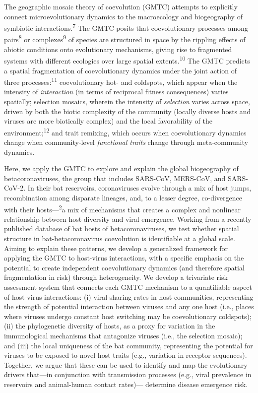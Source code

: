 \documentclass[11pt]{article}
\begin{document}
The geographic mosaic theory of coevolution (GMTC) attempts to
explicitly connect microevolutionary dynamics to the macroecology and
biogeography of symbiotic interactions.\textsuperscript{7} The GMTC
posits that coevolutionary processes among pairs\textsuperscript{8} or
complexes\textsuperscript{9} of species are structured in space by the
rippling effects of abiotic conditions onto evolutionary mechanisms,
giving rise to fragmented systems with different ecologies over large
spatial extents.\textsuperscript{10} The GMTC predicts a spatial
fragmentation of coevolutionary dynamics under the joint action of three
processes:\textsuperscript{11} coevolutionary hot- and coldspots, which
appear when the intensity of \emph{interaction} (in terms of reciprocal
fitness consequences) varies spatially; selection mosaics, wherein the
intensity of \emph{selection} varies across space, driven by both the
biotic complexity of the community (locally diverse hosts and viruses
are more biotically complex) and the local favorability of the
environment;\textsuperscript{12} and trait remixing, which occurs when
coevolutionary dynamics change when community-level \emph{functional
traits} change through meta-community dynamics.

Here, we apply the GMTC to explore and explain the global biogeography
of betacoronaviruses, the group that includes SARS-CoV, MERS-CoV, and
SARS-CoV-2. In their bat reservoirs, coronaviruses evolve through a mix
of host jumps, recombination among disparate lineages, and, to a lesser
degree, co-divergence with their hosts---\textsuperscript{2}a mix of
mechanisms that creates a complex and nonlinear relationship between
host diversity and viral emergence. Working from a recently published
database of bat hosts of betacoronaviruses, we test whether spatial
structure in bat-betacoronavirus coevolution is identifiable at a global
scale. Aiming to explain these patterns, we develop a generalized
framework for applying the GMTC to host-virus interactions, with a
specific emphasis on the potential to create independent coevolutionary
dynamics (and therefore spatial fragmentation in risk) through
heterogeneity. We develop a trivariate risk assessment system that
connects each GMTC mechanism to a quantifiable aspect of host-virus
interactions: (i) viral sharing rates in host communities, representing
the strength of potential interaction between viruses and any one host
(i.e., places where viruses undergo constant host switching may be
coevolutionary coldspots); (ii) the phylogenetic diversity of hosts, as
a proxy for variation in the immunological mechanisms that antagonize
viruses (i.e., the selection mosaic); and (iii) the local uniqueness of
the bat community, representing the potential for viruses to be exposed
to novel host traits (e.g., variation in receptor sequences). Together,
we argue that these can be used to identify and map the evolutionary
drivers that---in conjunction with transmission processes (e.g., viral
prevalence in reservoirs and animal-human contact rates)--- determine
disease emergence risk.
\end{document}
